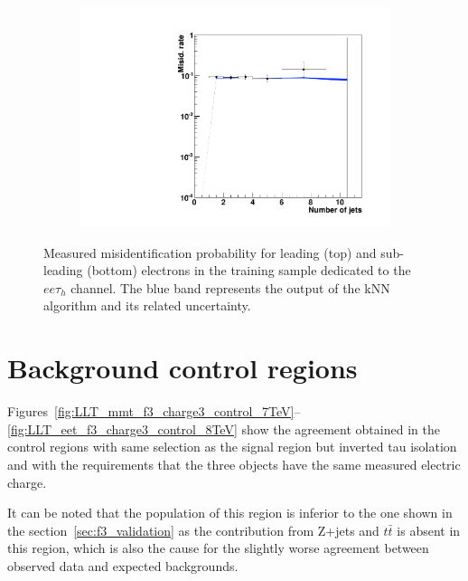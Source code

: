 \begin{figure}
\begin{subfigure}[b]{0.33\textwidth}
                \includegraphics[width=\textwidth]{4_Analisys/pics/8TeV/plots/fakerates/e_eet_subleading_kNN_numJets20.pdf}
                \caption{}
        \end{subfigure}
        \caption{Measured misidentification probability for leading (top) and sub-leading (bottom) electrons in the training sample dedicated to the $ee\tau_h$ channel. The blue band represents the output of the kNN algorithm and its related uncertainty.}\label{fig:fake_rate_eet}
\end{figure}

\section{Background control regions}

Figures~\ref{fig:LLT_mmt_f3_charge3_control_7TeV}--\ref{fig:LLT_eet_f3_charge3_control_8TeV} show the agreement obtained in the control regions with same selection as the signal region but inverted tau isolation and with the requirements that the three objects have the same measured electric charge.

It can be noted that the population of this region is inferior to the one shown in the section~\ref{sec:f3_validation} as the contribution from Z+jets and $t\bar{t}$ is absent in this region, which is also the cause for the slightly worse agreement between observed data and expected backgrounds.

